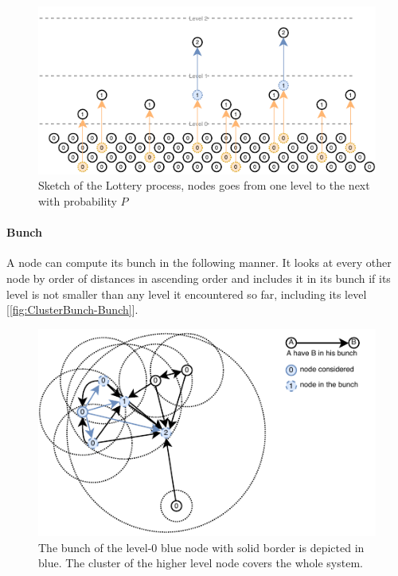 \documentclass[a4paper,11pt,twoside,openright]{report}
\begin{document}
\begin{figure}[!h] 
\centering
\includegraphics[width=400pt]{figures/Lottery-Standard}
\caption{Sketch of the Lottery process, nodes goes from one level to the next
  with probability $P$} \label{fig:ClusterBunch-Bunch}
\end{figure}

\paragraph{Bunch} A node can compute its bunch in the following manner. It
looks at every other node by order of distances in ascending order and
includes it in its bunch if its level is not smaller than any level it encountered
so far, including its level [\autoref{fig:ClusterBunch-Bunch}]. 

\begin{figure}[!h] 
\centering
\includegraphics[width=350pt]{figures/ClusterBunch-Bunch}
\caption{ The bunch of the  level-0 blue node with solid border is depicted in blue. The cluster of the higher
  level node covers the whole system. } \label{fig:ClusterBunch-Bunch}
\end{figure}
\end{document}
